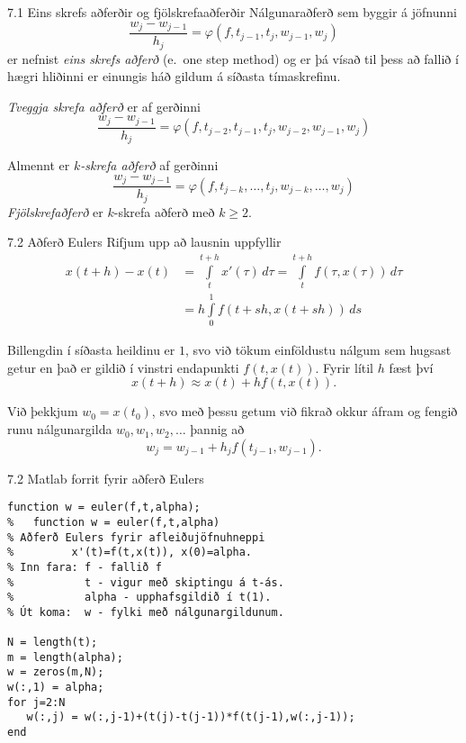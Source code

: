 \begin{frame}{7.1 Eins skrefs aðferðir og fjölskrefaaðferðir} 
Nálgunaraðferð sem byggir á jöfnunni
$$
  \dfrac{w_j-w_{j-1}}{h_j}=\varphi(f,t_{j-1},t_j,w_{j-1},w_j)
$$
er nefnist {\it eins skrefs aðferð} (e.~one step method) og er þá
vísað til þess að fallið í hægri hliðinni er einungis háð gildum á
síðasta tímaskrefinu.

\pause
\smallskip
{\it Tveggja skrefa aðferð} er af gerðinni
$$
  \dfrac{w_j-w_{j-1}}{h_j}=\varphi(f,t_{j-2},t_{j-1},t_j,w_{j-2},w_{j-1},w_j)
$$

\pause
\smallskip
Almennt er {\it $k$-skrefa aðferð} af gerðinni
$$
\dfrac{w_j-w_{j-1}}{h_j}=\varphi(f,t_{j-k},\dots,t_j,w_{j-k},\dots,w_j)
$$
{\it Fjölskrefaðferð} er  $k$-skrefa aðferð með $k\geq 2$.
\end{frame}


\begin{frame}{7.2 Aðferð Eulers} 
Rifjum upp að lausnin uppfyllir
\begin{align*}
  x(t+h) - x(t) &= \int\limits_t^{t+h} x'(\tau) \, d\tau
  = \int\limits_t^{t+h} f(\tau,x(\tau)) \, d\tau\\
&= h\int\limits_0^{1} f(t+sh,x(t+sh)) \, ds
\end{align*}

\pause
\smallskip
Billengdin í síðasta heildinu er $1$, svo við 
tökum einföldustu nálgum sem hugsast getur 
en það er gildið í vinstri endapunkti
$f(t,x(t))$.   Fyrir lítil $h$ fæst því 
\begin{equation*}
  x(t+h) \approx x(t) + hf(t,x(t)).
\end{equation*}

\pause
\smallskip
Við þekkjum $w_0=x(t_0)$, svo með þessu getum við fikrað okkur áfram
og  fengið runu nálgunargilda $w_0, w_1, w_2, \ldots$ þannig að
\begin{equation*}
  w_j = w_{j-1} + h_{j} f(t_{j-1},w_{j-1}).
\end{equation*}
\end{frame}


\begin{frame}[fragile]{7.2 Matlab forrit fyrir aðferð Eulers} 
\begin{verbatim}
function w = euler(f,t,alpha);  
%   function w = euler(f,t,alpha) 
% Aðferð Eulers fyrir afleiðujöfnuhneppi 
%         x'(t)=f(t,x(t)), x(0)=alpha. 
% Inn fara: f - fallið f 
%           t - vigur með skiptingu á t-ás. 
%           alpha - upphafsgildið í t(1). 
% Út koma:  w - fylki með nálgunargildunum. 

N = length(t);   
m = length(alpha); 
w = zeros(m,N);  
w(:,1) = alpha; 
for j=2:N 
   w(:,j) = w(:,j-1)+(t(j)-t(j-1))*f(t(j-1),w(:,j-1));
end 
\end{verbatim}
\end{frame}

